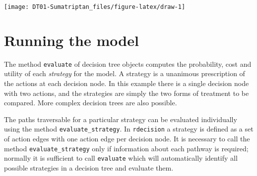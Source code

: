 \documentclass[
]{article}
\newenvironment{Shaded}{\begin{snugshade}}{\end{snugshade}}
\newcommand{\AttributeTok}[1]{\textcolor[rgb]{0.77,0.63,0.00}{#1}}
\newcommand{\CommentTok}[1]{\textcolor[rgb]{0.56,0.35,0.01}{\textit{#1}}}
\newcommand{\FunctionTok}[1]{\textcolor[rgb]{0.00,0.00,0.00}{#1}}
\newcommand{\NormalTok}[1]{#1}
\newcommand{\OtherTok}[1]{\textcolor[rgb]{0.56,0.35,0.01}{#1}}
\newcommand{\SpecialCharTok}[1]{\textcolor[rgb]{0.00,0.00,0.00}{#1}}
\newcommand{\StringTok}[1]{\textcolor[rgb]{0.31,0.60,0.02}{#1}}
\begin{document}
\begin{Shaded}
\end{Shaded}

\begin{center}\texttt{[image: DT01-Sumatriptan\_files/figure-latex/draw-1]} \end{center}

\hypertarget{running-the-model}{%
\section{Running the model}\label{running-the-model}}

The method \texttt{evaluate} of decision tree objects computes the
probability, cost and utility of each \emph{strategy} for the model. A
strategy is a unanimous prescription of the actions at each decision
node. In this example there is a single decision node with two actions,
and the strategies are simply the two forms of treatment to be compared.
More complex decision trees are also possible.

The paths traversable for a particular strategy can be evaluated
individually using the method \texttt{evaluate\_strategy}. In
\texttt{rdecision} a strategy is defined as a set of action edges with
one action edge per decision node. It is necessary to call the method
\texttt{evaluate\_strategy} only if information about each pathway is
required; normally it is sufficient to call \texttt{evaluate} which will
automatically identify all possible strategies in a decision tree and
evaluate them.
\end{document}
